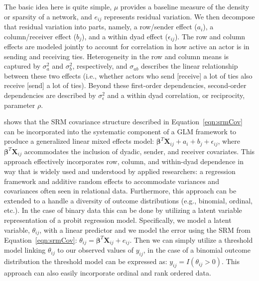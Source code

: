 The basic idea here is quite simple, $\mu$ provides a baseline measure of the density or sparsity of a network, and $e_{ij}$ represents residual variation. We then decompose that residual variation into parts, namely, a row/sender effect ($a_{i}$), a column/receiver effect ($b_{j}$), and a within dyad effect ($\epsilon_{ij}$). The row and column effects are modeled jointly to account for correlation in how active an actor is in sending and receiving ties. Heterogeneity in the row and column means is captured by $\sigma_{a}^{2}$ and $\sigma_{b}^{2}$, respectively, and $\sigma_{ab}$ describes the linear relationship between these two effects (i.e., whether actors who send [receive] a lot of ties also receive [send] a lot of ties). Beyond these first-order dependencies, second-order dependencies are described by $\sigma_{\epsilon}^{2}$ and a within dyad correlation, or reciprocity, parameter $\rho$. 

\citet{hoff:2005} shows that the SRM covariance structure described in Equation~\ref{eqn:srmCov} can be incorporated into the systematic component of a GLM framework to produce a generalized linear mixed effects model: $\bm\beta^{T} \mathbf{X}_{ij} + a_{i} + b_{j} + \epsilon_{ij}$, where $ \bm\beta^{T} \mathbf{X}_{ij}$ accommodates the inclusion of dyadic, sender, and receiver covariates. This approach  effectively incorporates row, column, and within-dyad dependence in way that is widely used and understood by applied researchers: a regression framework and additive random effects to accommodate variances and covariances often seen in relational data. Furthermore, this approach can be extended to a handle a diversity of outcome distributions (e.g., binomial, ordinal, etc.). In the case of binary data this can be done by utilizing a latent variable representation of a probit regression model. Specifically, we model a latent variable, $\theta_{ij}$, with a linear predictor and we model the error using the SRM from Equation~\ref{eqn:srmCov}: $\theta_{ij} = \bm\beta^{T} \mathbf{X}_{ij} + e_{ij}$. Then we can simply utilize a threshold model linking $\theta_{ij}$ to our observed values of $y_{ij}$, in the case of a binomial outcome distribution the threshold model can be expressed as: $y_{ij} = I(\theta_{ij}>0)$.  This approach can also easily incorporate ordinal and rank ordered data.


